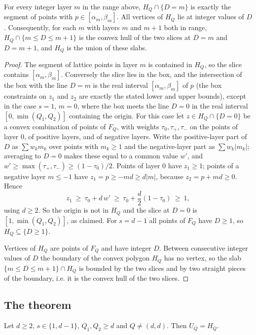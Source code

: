 \begin{lemma}\label{lem:slices}
For every integer layer $m$ in the range above, $H_Q\cap\{D=m\}$ is exactly the segment of points with $p\in[\alpha_m,\beta_m]$. All vertices of $H_Q$ lie at integer values of $D$. Consequently, for each $m$ with layers $m$ and $m+1$ both in range, $H_Q\cap\{m\le D\le m+1\}$ is the convex hull of the two slices at $D=m$ and $D=m+1$, and $H_Q$ is the union of these slabs.
\end{lemma}
\begin{proof}
The segment of lattice points in layer $m$ is contained in $H_Q$, so the slice contains $[\alpha_m,\beta_m]$. Conversely the slice lies in the box, and the intersection of the box with the line $D=m$ is the real interval $[\alpha_m,\beta_m]$ of $p$ (the box constraints on $z_1$ and $z_2$ are exactly the stated lower and upper bounds), except in the case $s=1$, $m=0$, where the box meets the line $D=0$ in the real interval $[0,\min(Q_1,Q_2)]$ containing the origin. For this case let $z\in H_Q\cap\{D=0\}$ be a convex combination of points of $F_Q$, with weights $\tau_0,\tau_+,\tau_-$ on the points of layer $0$, of positive layers, and of negative layers. Write the positive-layer part of $D$ as $\sum w_k m_k$ over points with $m_k\ge1$ and the negative-layer part as $\sum w_k|m_k|$; averaging to $D=0$ makes these equal to a common value $w'$, and $w'\ge\max(\tau_+,\tau_-)\ge(1-\tau_0)/2$. Points of layer $0$ have $z_1\ge1$; points of a negative layer $m\le-1$ have $z_1=p\ge-md\ge d|m|$, because $z_2=p+md\ge0$. Hence
\[
  z_1\ \ge\ \tau_0+d\,w'\ \ge\ \tau_0+\frac d2(1-\tau_0)\ \ge\ 1,
\]
using $d\ge2$. So the origin is not in $H_Q$ and the slice at $D=0$ is $[1,\min(Q_1,Q_2)]$, as claimed. For $s=d-1$ all points of $F_Q$ have $D\ge1$, so $H_Q\subseteq\{D\ge1\}$.

Vertices of $H_Q$ are points of $F_Q$ and have integer $D$. Between consecutive integer values of $D$ the boundary of the convex polygon $H_Q$ has no vertex, so the slab $\{m\le D\le m+1\}\cap H_Q$ is bounded by the two slices and by two straight pieces of the boundary, i.e. it is the convex hull of the two slices.
\end{proof}

\subsection{The theorem}

\begin{theorem}\label{thm:L}
Let $d\ge2$, $s\in\{1,d-1\}$, $Q_1,Q_2\ge d$ and $Q\ne(d,d)$. Then $U_Q=H_Q$.
\end{theorem}

